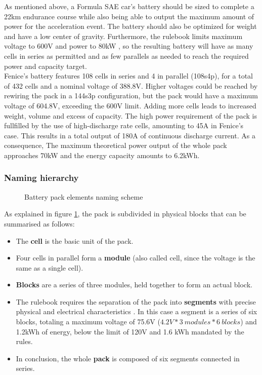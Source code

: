 As mentioned above, a Formula SAE car's battery should be sized to complete a 22km endurance course while also being able to output the maximum amount of power for the acceleration event. The battery should also be optimized for weight and have a low center of gravity. Furthermore, the rulebook limits maximum voltage to 600V \cite[EV 4.1.1]{fsg2020} and power to 80kW \cite[EV 2.2.1]{fsg2020}, so the resulting battery will have as many cells in series as permitted and as few parallels as needed to reach the required power and capacity target.\\
Fenice's battery features 108 cells in series and 4 in parallel (108s4p), for a total of 432 cells and a nominal voltage of 388.8V. Higher voltages could be reached by rewiring the pack in a 144s3p configuration, but the pack would have a maximum voltage of 604.8V, exceeding the 600V limit. Adding more cells leads to increased weight, volume and excess of capacity.
The high power requirement of the pack is fullfilled by the use of high-discharge rate cells, amounting to 45A in Fenice's case. This results in a total output of 180A of continuous discharge current. As a consequence, The maximum theoretical power output of the whole pack approaches 70kW and the energy capacity amounts to 6.2kWh.

\subsubsection{Naming hierarchy}

\begin{figure}[h]
    \centering
    
    \caption{Battery pack elements naming scheme}
    \label{fig:naming}
\end{figure}
As explained in figure \ref{fig:naming}, the pack is subdivided in physical blocks that can be summarised as follows:

\begin{itemize}
    \item The \textbf{cell} is the basic unit of the pack.
    \item Four cells in parallel form a \textbf{module} (also called cell, since the voltage is the same as a single cell).
    \item \textbf{Blocks} are a series of three modules, held together to form an actual block.
    \item The rulebook requires the separation of the pack into \textbf{segments} with precise physical and electrical characteristics \cite[EV 5.3.2]{fsg2020}. In this case a segment is a series of six blocks, totaling a maximum voltage of 75.6V ($4.2V*3\ modules*6\ blocks$) and 1.2kWh of energy, below the limit of 120V and 1.6 kWh mandated by the rules.
    \item In conclusion, the whole \textbf{pack} is composed of six segments connected in series.
\end{itemize}

